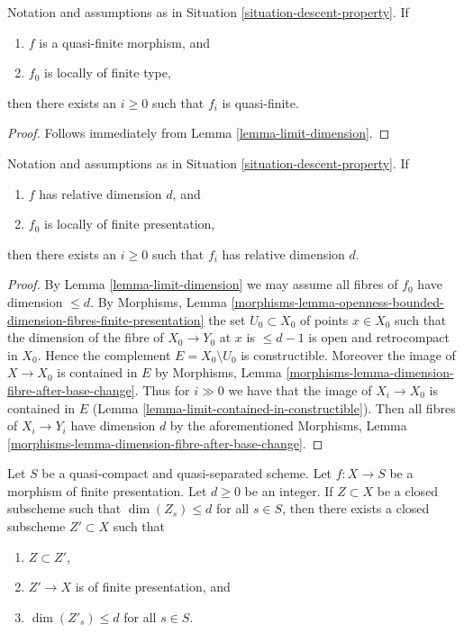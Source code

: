 \begin{lemma}
\label{lemma-descend-quasi-finite}
Notation and assumptions as in Situation \ref{situation-descent-property}.
If
\begin{enumerate}
\item $f$ is a quasi-finite morphism, and
\item $f_0$ is locally of finite type,
\end{enumerate}
then there exists an $i \geq 0$ such that $f_i$ is quasi-finite.
\end{lemma}

\begin{proof}
Follows immediately from Lemma \ref{lemma-limit-dimension}.
\end{proof}

\begin{lemma}
\label{lemma-descend-dimension-d}
Notation and assumptions as in Situation \ref{situation-descent-property}.
If
\begin{enumerate}
\item $f$ has relative dimension $d$, and
\item $f_0$ is locally of finite presentation,
\end{enumerate}
then there exists an $i \geq 0$ such that $f_i$
has relative dimension $d$.
\end{lemma}

\begin{proof}
By Lemma \ref{lemma-limit-dimension} we may assume all fibres
of $f_0$ have dimension $\leq d$. By Morphisms, Lemma
\ref{morphisms-lemma-openness-bounded-dimension-fibres-finite-presentation}
the set $U_0 \subset X_0$ of points $x \in X_0$ such that
the dimension of the fibre of $X_0 \to Y_0$ at $x$ is $\leq d - 1$
is open and retrocompact in $X_0$. Hence the complement
$E = X_0 \setminus U_0$ is constructible.
Moreover the image of $X \to X_0$ is contained in $E$
by Morphisms, Lemma \ref{morphisms-lemma-dimension-fibre-after-base-change}.
Thus for $i \gg 0$ we have that the image
of $X_i \to X_0$ is contained in $E$
(Lemma \ref{lemma-limit-contained-in-constructible}). Then all fibres
of $X_i \to Y_i$ have dimension $d$ by the aforementioned
Morphisms, Lemma \ref{morphisms-lemma-dimension-fibre-after-base-change}.
\end{proof}

\begin{lemma}
\label{lemma-approximate-given-relative-dimension}
Let $S$ be a quasi-compact and quasi-separated scheme.
Let $f : X \to S$ be a morphism of finite presentation.
Let $d \geq 0$ be an integer.
If $Z \subset X$ be a closed subscheme such that
$\dim(Z_s) \leq d$ for all $s \in S$, then there exists a
closed subscheme $Z' \subset X$ such that
\begin{enumerate}
\item $Z \subset Z'$,
\item $Z' \to X$ is of finite presentation, and
\item $\dim(Z'_s) \leq d$ for all $s \in S$.
\end{enumerate}
\end{lemma}

